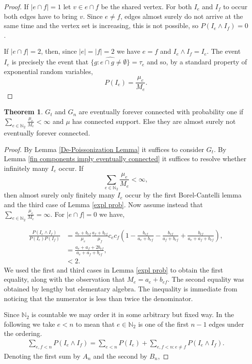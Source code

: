 \documentclass[12pt]{article}
\theoremstyle{definition}
\newtheorem{theorem}[proposition]{Theorem}
\begin{document}
\begin{proof}
If $|e \cap f|=1$ let $ v \in e \cap f$ be the shared vertex. For both $I_e$ and $I_f$ to occur both edges have to bring $v$. Since $e \neq f$, edges almost surely do not arrive at the same time and the vertex set is increasing, this is not possible, so $P(I_e \wedge I_f) = 0$.

If $|e \cap f| = 2$, then, since $|e|=|f|=2$ we have $e=f$ and $I_e \wedge I_f = I_e$.
The event $I_e$ is precisely the event that $\hat{\{g: e \cap g \neq \emptyset \}} = \tau_e$ and so, by a standard property of exponential random variables,
    $$P(I_e)=\frac{\mu_e}{M_e}.$$ 
\end{proof}
\begin{theorem} \label{Eventual forever connectedness thm}
    $G_t$ and $G_n$ are eventually forever connected with probability one if $\sum_{e \in \mathbb{N}_2}\frac{\mu_e}{M_e} < \infty$ and $\mu$ has connected support. Else they are almost surely not eventually forever connected.
\end{theorem} \begin{proof} By Lemma \ref{De-Poissonization Lemma} it suffices to consider $G_t$. By Lemma \ref{fin components imply eventually connected}  it suffices to resolve whether infinitely many $I_e$ occur. If $$\sum_{e \in \mathbb{N}_2} \frac{\mu_e}{M_e} < \infty,$$ then almost surely only finitely many $I_e$ occur by the first Borel-Cantelli lemma and the third case of Lemma \ref{expl prob}. Now assume instead that $\sum_{e \in \mathbb{N}_2} \frac{\mu_e}{M_e} = \infty$.  For $|e \cap f| = 0$ we have,

    \begin{align*}
        \frac{P(I_e \wedge I_f)}{P(I_e)P(I_f)} &= \frac{a_e+b_{ef}}{\mu_e}\frac{a_f+b_{ef}}{\mu_f}c_ec_f\left(1-\frac{b_{ef}}{a_e+b_{ef}}-\frac{b_{ef}}{a_f+b_{ef}}+\frac{b_{ef}}{a_e+a_f+b_{ef}}\right), \\
        &= \frac{a_e+a_f+2b_{ef}}{a_e+a_f+b_{ef}}, \\
        &< 2.
    \end{align*} We used the first and third cases in Lemma \ref{expl prob} to obtain the first equality, along with the observation that $M_e = a_e+b_{ef}$. The second equality was obtained by lengthy but elementary algebra. The inequality is immediate from noticing that the numerator is less than twice the denominator.
    
    Since $\mathbb{N}_2$ is countable we may order it in some arbitrary but fixed way. In the following we take $e < n$ to mean that $e \in \mathbb{N}_2$ is one of the first $n-1$ edges under the ordering.
\begin{align*}
    \sum_{e,f < n}P(I_e \wedge I_f) = \sum_{e < n}P(I_e) + \sum_{e,f < n: e \neq f}P(I_e \wedge I_f).
\end{align*}
Denoting the first sum by $A_n$ and the second by $B_n$,


\end{proof}
\end{document}
